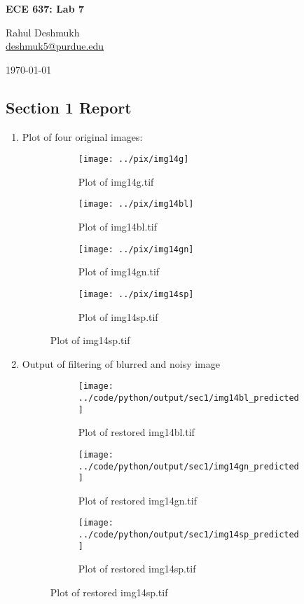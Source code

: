 \documentclass[a4paper,11pt]{article}
\begin{document}
\begin{center}
\Large{\textbf{ECE 637: Lab 7}}

Rahul Deshmukh\\\href{mailto:deshmuk5@purdue.edu}{{\color{blue}deshmuk5@purdue.edu}}

\today
\end{center}

\subsection*{Section 1 Report} 
\begin{enumerate}
\item Plot of four original images:
 \begin{figure}[!hp]
  \centering
\begin{subfigure}{0.45\textwidth}
  \texttt{[image: ../pix/img14g]}
 \caption{Plot of img14g.tif}
 \end{subfigure}
\begin{subfigure}{0.45\textwidth}
  \texttt{[image: ../pix/img14bl]}
 \caption{Plot of img14bl.tif}
 \end{subfigure}
 \vfill
 \begin{subfigure}{0.45\textwidth}
  \texttt{[image: ../pix/img14gn]}
 \caption{Plot of img14gn.tif}
 \end{subfigure}
 \begin{subfigure}{0.45\textwidth}
  \texttt{[image: ../pix/img14sp]}
 \caption{Plot of img14sp.tif}
 \end{subfigure}  
 \end{figure}

\clearpage
\item Output of filtering of blurred and noisy image
 \begin{figure}[!hp]
  \centering
\begin{subfigure}{0.45\textwidth}
  \texttt{[image: ../code/python/output/sec1/img14bl\_predicted]}
 \caption{Plot of restored img14bl.tif}
 \end{subfigure}
 \vfill
 \begin{subfigure}{0.45\textwidth}
  \texttt{[image: ../code/python/output/sec1/img14gn\_predicted]}
 \caption{Plot of restored img14gn.tif}
 \end{subfigure}
 \begin{subfigure}{0.45\textwidth}
  \texttt{[image: ../code/python/output/sec1/img14sp\_predicted]}
 \caption{Plot of restored img14sp.tif}
 \end{subfigure}  
 \end{figure}


\end{enumerate}
\end{document}
